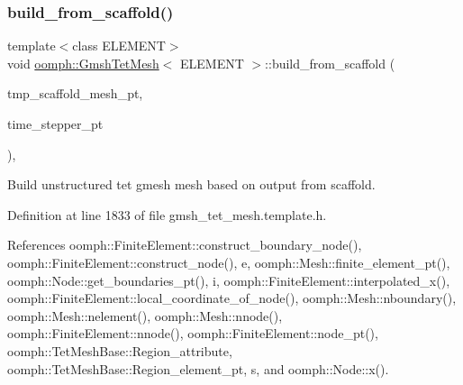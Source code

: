 \subsubsection{\texorpdfstring{build\+\_\+from\+\_\+scaffold()}{build\_from\_scaffold()}}
{\footnotesize\ttfamily template$<$class E\+L\+E\+M\+E\+NT$>$ \\
void \hyperlink{classoomph_1_1GmshTetMesh}{oomph\+::\+Gmsh\+Tet\+Mesh}$<$ E\+L\+E\+M\+E\+NT $>$\+::build\+\_\+from\+\_\+scaffold (\begin{DoxyParamCaption}\item[{\hyperlink{classoomph_1_1GmshTetScaffoldMesh}{Gmsh\+Tet\+Scaffold\+Mesh} $\ast$}]{tmp\+\_\+scaffold\+\_\+mesh\+\_\+pt,  }\item[{\hyperlink{classoomph_1_1TimeStepper}{Time\+Stepper} $\ast$}]{time\+\_\+stepper\+\_\+pt }\end{DoxyParamCaption})\hspace{0.3cm}{\ttfamily [inline]}, {\ttfamily [private]}}



Build unstructured tet gmesh mesh based on output from scaffold. 



Definition at line 1833 of file gmsh\+\_\+tet\+\_\+mesh.\+template.\+h.



References oomph\+::\+Finite\+Element\+::construct\+\_\+boundary\+\_\+node(), oomph\+::\+Finite\+Element\+::construct\+\_\+node(), e, oomph\+::\+Mesh\+::finite\+\_\+element\+\_\+pt(), oomph\+::\+Node\+::get\+\_\+boundaries\+\_\+pt(), i, oomph\+::\+Finite\+Element\+::interpolated\+\_\+x(), oomph\+::\+Finite\+Element\+::local\+\_\+coordinate\+\_\+of\+\_\+node(), oomph\+::\+Mesh\+::nboundary(), oomph\+::\+Mesh\+::nelement(), oomph\+::\+Mesh\+::nnode(), oomph\+::\+Finite\+Element\+::nnode(), oomph\+::\+Finite\+Element\+::node\+\_\+pt(), oomph\+::\+Tet\+Mesh\+Base\+::\+Region\+\_\+attribute, oomph\+::\+Tet\+Mesh\+Base\+::\+Region\+\_\+element\+\_\+pt, s, and oomph\+::\+Node\+::x().

\mbox{\label{classoomph_1_1GmshTetMesh_aaec22ccd211f81dd440e9618d6667718}} 
